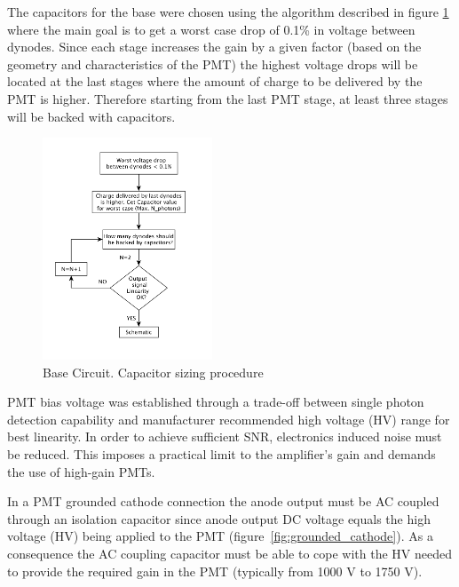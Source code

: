 \documentclass[a4paper, 10pt, oneside, twocolumn, 3p]{elsarticle}
\begin{document}
\par The capacitors for the base were chosen using the algorithm described in figure \ref{fig:Base_Sizing} where the main goal is to get a worst case drop of 0.1\% in voltage between dynodes. Since each stage increases the gain by a given factor (based on the geometry and characteristics of the PMT) the highest voltage drops will be located at the last stages where the amount of charge to be delivered by the PMT is higher. Therefore starting from the last PMT stage, at least three stages will be backed with capacitors. 

\begin{figure}
  \begin{center}
    \includegraphics[width=0.45\textwidth]{./figures/diagrama.png}
    \caption{Base Circuit. Capacitor sizing procedure}
    \label{fig:Base_Sizing}
  \end{center}
\end{figure}

\par PMT bias voltage was established through a trade-off between single photon detection capability and manufacturer recommended high voltage (HV) range for best linearity. In order to achieve sufficient SNR, electronics induced noise must be reduced. This imposes a practical limit to the amplifier's gain and demands the use of \mbox{high-gain} PMTs.



\par In a PMT grounded cathode connection the anode output must be AC coupled through an isolation capacitor since anode output DC voltage equals the high voltage (HV) being applied to the PMT (figure~\ref{fig:grounded_cathode}). As a consequence the AC coupling capacitor must be able to cope with the HV needed to provide the required gain in the PMT (typically from 1000 V to 1750 V). 
\end{document}
